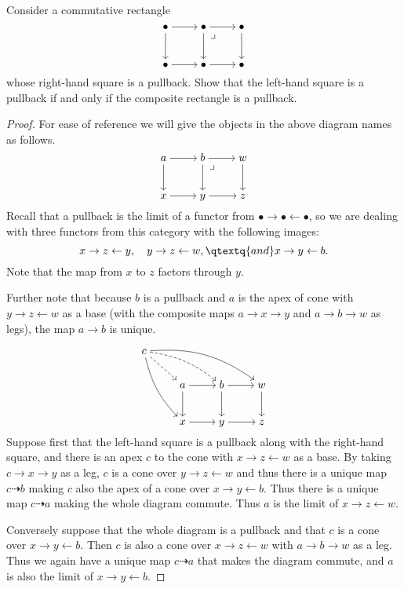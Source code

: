 \documentclass[main.tex]{subfiles}
\begin{document}
\paragraph{}
\begin{exercise}
	Consider a commutative rectangle
	\[\begin{tikzcd}[cramped]
			\bullet \ar[r] \ar[d] &
			\bullet \ar[r] \ar[d] \ar[dr, phantom, "\lrcorner", very near start] &
			\bullet \ar[d] \\[0.6em]
			\bullet \ar[r] &
			\bullet \ar[r] &
			\bullet
	\end{tikzcd}\]
	whose right-hand square is a pullback. Show that the left-hand square is a
	pullback if and only if the composite rectangle is a pullback.
\end{exercise}

\begin{proof}
	For ease of reference we will give the objects in the above diagram names as
	follows.
	\[\begin{tikzcd}[cramped]
			a \ar[r] \ar[d] &
			b \ar[r] \ar[d] \ar[dr, phantom, "\lrcorner", very near start] &
			w \ar[d] \\[0.6em]
			x \ar[r] &
			y \ar[r] &
			z
	\end{tikzcd}\]
	Recall that a pullback is the limit of a functor from
	\(\bullet\to\bullet\gets\bullet\), so we are dealing with three functors
	from this category with the following images:
	\[x\to z\gets y,\quad y\to z\gets w,\qtextq{and} x\to y\gets b .\] Note that
	the map from \(x\) to \(z\) factors through \(y\).

	Further note that because \(b\) is a pullback and \(a\) is the apex of cone
	with \(y\to z\gets w\) as a base (with the composite maps \(a\to x\to y\)
	and \(a\to b\to w\) as legs), the map \(a\to b\) is unique.

	\[\begin{tikzcd}[cramped]
			c \ar[dr, dashed] \ar[drr, dashed, bend left=15]
			\ar[drrr, bend left=20] \ar[ddr, bend right=15] \\ &
			a \ar[r] \ar[d] &
			b \ar[r] \ar[d] &
			w \ar[d] \\[0.5em] &
			x \ar[r] &
			y \ar[r] &
			z
	\end{tikzcd}\]
	Suppose first that the left-hand square is a pullback along with the
	right-hand square, and there is an apex \(c\) to the cone with
	\(x\to z\gets w\) as a base.
	By taking \(c\to x\to y\) as a leg, \(c\) is a cone over
	\(y\to z\gets w\) and thus there is a unique map \(c\dashrightarrow b\)
	making \(c\) also the apex of a cone over \(x\to y\gets b\). Thus there is a
	unique map \(c\dashrightarrow a\) making the whole diagram commute. Thus
	\(a\) is the limit of \(x\to z\gets w\).
	
	Conversely suppose that the whole diagram is a pullback and that \(c\) is a
	cone over \(x\to y\gets b\). Then \(c\) is also a cone over
	\(x\to z\gets w\) with \(a\to b\to w\) as a leg. Thus we again have a unique
	map \(c\dashrightarrow a\) that makes the diagram commute, and \(a\) is also
	the limit of \(x\to y\gets b\).
\end{proof}
\end{document}
